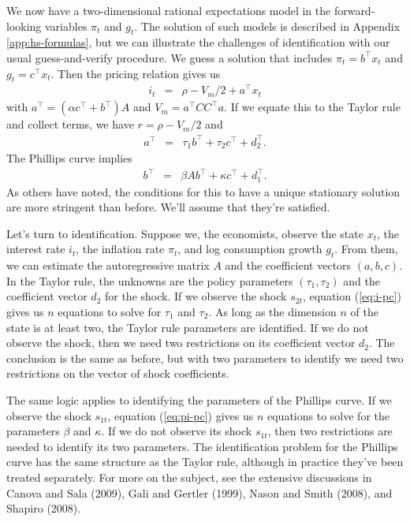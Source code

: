 \documentclass[11pt]{article}
\begin{document}
{We now have a two-dimensional rational expectations model
in the forward-looking variables $\pi_t$ and $g_t$.
The solution of such models is described in Appendix \ref{app:hs-formulas},
but we can illustrate the challenges of identification
with our usual guess-and-verify procedure.
We guess a solution that includes
$\pi_t = b^\top x_t$ and $g_t = c^\top x_t$.
Then the pricing relation gives us
\begin{eqnarray*}
        i_t &=& \rho - V_m/2 + a^\top x_t %
\end{eqnarray*}
with
$  a^\top =  (\alpha c^\top + b^\top)  A  $
and $  V_m = a^\top C C^\top a $.
If we equate this to the Taylor rule and collect terms,
we have $ r = \rho - V_m/2 $ and
\begin{eqnarray}
    a^\top &=& \tau_1 b^\top + \tau_2 c^\top + d_2^\top .
    \label{eq:i-pc}
\end{eqnarray}
The Phillips curve implies
\begin{eqnarray}
    b^\top &=& \beta  A  b^\top + \kappa c^\top + d_1^\top .
    \label{eq:pi-pc}
\end{eqnarray}
As others have noted, the conditions for this to have a unique stationary solution
are more stringent than before.  
We'll assume that they're satisfied.


Let's turn to identification.
Suppose we, the economists, observe the state $x_t$, the interest rate $i_t$,
the inflation rate $\pi_t$, and log consumption growth $g_t$.
From them, we can estimate the autoregressive matrix $ A $
and the coefficient vectors $(a,b,c)$.
In the Taylor rule, the unknowns are the policy parameters $(\tau_1,\tau_2)$
and the coefficient vector $d_2$ for the shock.
If we observe the shock $s_{2t}$,
equation (\ref{eq:i-pc}) gives us $n$ equations
to solve for $\tau_1$ and $\tau_2$.
As long as the dimension $n$ of the state is at least two, the Taylor rule
parameters are identified.
If we do not observe the shock, then we need two restrictions on its
coefficient vector $d_2$.
The conclusion is the same as before,
but with two parameters to identify we need two restrictions
on the vector of shock coefficients.

The same logic applies to identifying the parameters of the Phillips curve.
If we observe the shock $s_{1t}$,
equation (\ref{eq:pi-pc}) gives us $n$ equations to solve for
the parameters $\beta$ and $\kappa$.
If we do not observe its shock $s_{1t}$, then two restrictions are needed
to identify its two parameters.
The identification problem for the Phillips curve has the same structure as
the Taylor rule, although in practice they've been treated separately.
For more on the subject,
see the extensive discussions in Canova and Sala (2009),
Gali and Gertler (1999),
Nason and Smith (2008), and Shapiro (2008).

}
\end{document}
